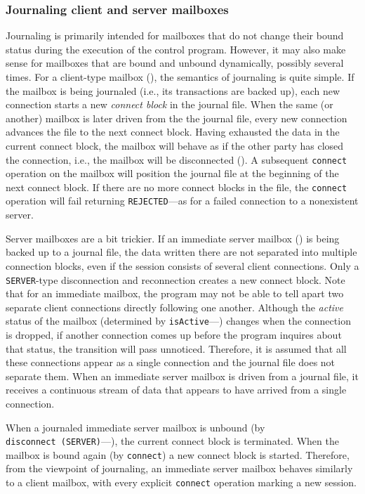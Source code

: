 \subsubsection{Journaling client and server mailboxes}
\label{rm_mb_ju_sm}

Journaling is primarily intended for mailboxes that do not change their
bound status during the execution of the control program.
However, it may also make sense for mailboxes that are bound and unbound
dynamically, possibly several times.
For a client-type mailbox (), the semantics of journaling
is quite simple.
If the mailbox is being journaled (i.e., its transactions are backed up),
each new connection starts a new {\em connect block\/} in the journal file.
When the same (or another) mailbox is later driven from the the journal
file, every new connection advances the file to the next connect block.
Having exhausted the data in the current connect block, the mailbox will
behave as if the other party has closed the connection, i.e., the
mailbox will be disconnected ().
A subsequent {\tt connect} operation on the mailbox will position
the journal file at the beginning of the next connect block.
If there are no more connect blocks in the file, the {\tt connect}
operation will fail returning {\tt REJECTED}---as for a failed connection
to a nonexistent server.

Server mailboxes are a bit trickier.
If an immediate server mailbox () is being backed up
to a journal file, the data written there are not separated into
multiple connection blocks, even if the session consists of several
client connections.
Only a {\tt SERVER}-type disconnection and reconnection creates a new
connect block.
Note that for an immediate mailbox, the program may not be able to tell apart
two separate client connections directly following one another.
Although the {\em active\/} status of the mailbox
(determined by {\tt isActive}---) changes when the
connection is dropped, if another connection comes up before the program
inquires about that status, the transition will pass unnoticed.
Therefore, it is assumed that all these connections appear as a single
connection and the journal file does not separate them.
When an immediate server mailbox is driven from a journal file, it receives
a continuous stream of data that appears to have arrived from a single
connection.

When a journaled immediate server mailbox is unbound
(by {\tt disconnect~(SERVER)}---),
the current connect block is terminated.
When the mailbox is bound again (by {\tt connect}) a new connect block
is started.
Therefore, from the viewpoint of journaling,
an immediate server mailbox behaves similarly to a client mailbox, with
every explicit {\tt connect} operation marking a new session.

